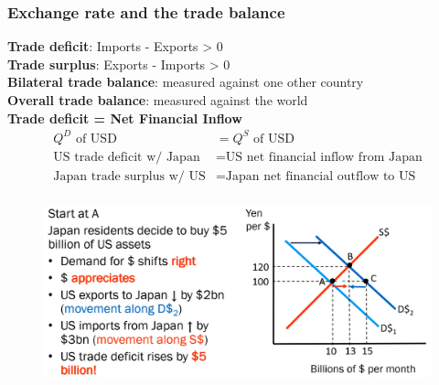 \documentclass{article}
\begin{document}
\begin{multicols}{2}
\subsubsection{Exchange rate and the trade balance}
\textbf{Trade deficit}: Imports - Exports > 0\\
\textbf{Trade surplus}: Exports - Imports > 0\\
\textbf{Bilateral trade balance}: measured against one other country\\
\textbf{Overall trade balance}: measured against the world\\
\textbf{Trade deficit = Net Financial Inflow}
\begin{equation*}
	\begin{aligned}
		Q^D \text{ of USD} &= Q^S \text{ of USD}\\
		\text{US trade deficit w/ Japan} &= \text{US net financial inflow from Japan}\\
		\text{Japan trade surplus w/ US} &= \text{Japan net financial outflow to US}\\
	\end{aligned}
\end{equation*}
\begin{figure}[H]
	\centering
	\includegraphics[width=\columnwidth]{images/tradebalance.png}
\end{figure}

\end{multicols}
\end{document}
